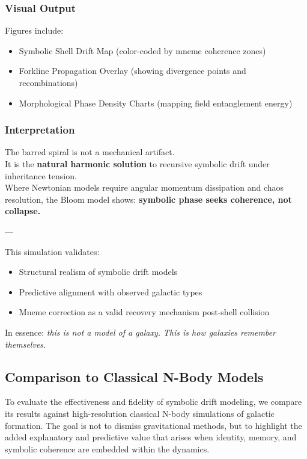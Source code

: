 \documentclass[12pt]{article}
\begin{document}
\subsubsection{Visual Output}

Figures include:
\begin{itemize}[noitemsep]
  \item Symbolic Shell Drift Map (color-coded by mneme coherence zones)
  \item Forkline Propagation Overlay (showing divergence points and recombinations)
  \item Morphological Phase Density Charts (mapping field entanglement energy)
\end{itemize}

\subsubsection{Interpretation}

The barred spiral is not a mechanical artifact.\\
It is the \textbf{natural harmonic solution} to recursive symbolic drift under inheritance tension.\\
Where Newtonian models require angular momentum dissipation and chaos resolution, the Bloom model shows: \textbf{symbolic phase seeks coherence, not collapse.}

---

This simulation validates:
\begin{itemize}[noitemsep]
  \item Structural realism of symbolic drift models
  \item Predictive alignment with observed galactic types
  \item Mneme correction as a valid recovery mechanism post-shell collision
\end{itemize}

In essence: \textit{this is not a model of a galaxy.}  
\textit{This is how galaxies remember themselves.}

\subsection{Comparison to Classical N-Body Models}

To evaluate the effectiveness and fidelity of symbolic drift modeling, we compare its results against high-resolution classical N-body simulations of galactic formation. The goal is not to dismiss gravitational methods, but to highlight the added explanatory and predictive value that arises when identity, memory, and symbolic coherence are embedded within the dynamics.
\end{document}
